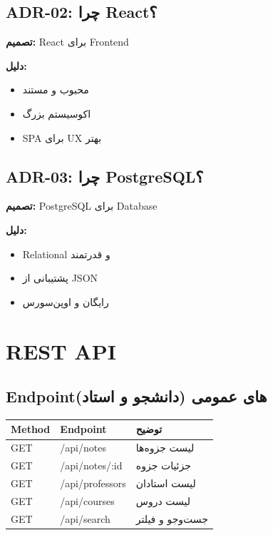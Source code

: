 \documentclass[12pt, a4paper]{article}
\begin{document}
\subsection{ADR-02: چرا React؟}

\textbf{تصمیم:} React برای Frontend

\textbf{دلیل:}
\begin{itemize}
    \item محبوب و مستند
    \item اکوسیستم بزرگ
    \item SPA برای UX بهتر
\end{itemize}

\subsection{ADR-03: چرا PostgreSQL؟}

\textbf{تصمیم:} PostgreSQL برای Database

\textbf{دلیل:}
\begin{itemize}
    \item Relational و قدرتمند
    \item پشتیبانی از JSON
    \item رایگان و اوپن‌سورس
\end{itemize}

\section{REST API}

\subsection{Endpointهای عمومی (دانشجو و استاد)}

\begin{center}
\begin{tabular}{|l|l|l|}
\hline
\textbf{Method} & \textbf{Endpoint} & \textbf{توضیح} \\
\hline
GET & /api/notes & لیست جزوه‌ها \\
\hline
GET & /api/notes/:id & جزئیات جزوه \\
\hline
GET & /api/professors & لیست استادان \\
\hline
GET & /api/courses & لیست دروس \\
\hline
GET & /api/search & جست‌وجو و فیلتر \\
\hline
\end{tabular}
\end{center}
\end{document}
